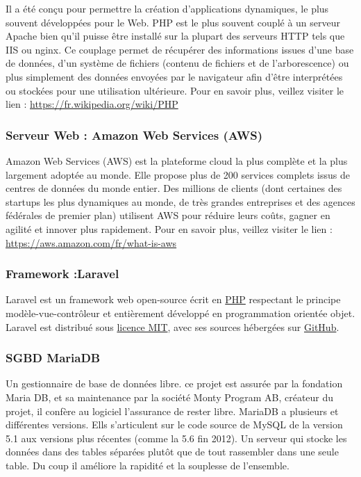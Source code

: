 Il a été conçu pour permettre la création d'applications dynamiques, le plus souvent développées pour le Web. PHP est le plus souvent couplé à un serveur Apache bien qu'il puisse être installé sur la plupart des serveurs HTTP tels que IIS ou nginx. Ce couplage permet de récupérer des informations issues d'une base de données, d'un système de fichiers (contenu de fichiers et de l'arborescence) ou plus simplement des données envoyées par le navigateur afin d'être interprétées ou stockées pour une utilisation ultérieure.
\newline Pour en savoir plus, veillez
visiter le lien : \href{https://fr.wikipedia.org/wiki/PHP}{https://fr.wikipedia.org/wiki/PHP}

\subsubsection{Serveur Web : Amazon Web Services (AWS)}
Amazon Web Services (AWS) est la plateforme cloud la plus complète et la plus largement adoptée au monde. Elle propose plus de 200 services complets issus de centres de données du monde entier. Des millions de clients (dont certaines des startups les plus dynamiques au monde, de très grandes entreprises et des agences fédérales de premier plan) utilisent AWS pour réduire leurs coûts, gagner en agilité et innover plus rapidement.
\newline Pour en savoir plus, veillez
visiter le lien : \href{https://aws.amazon.com/fr/what-is-aws/#:~:text=Amazon%20Web%20Services%20(AWS)%20est,de%20donn%C3%A9es%20du%20monde%20entier.}{https://aws.amazon.com/fr/what-is-aws}

\subsubsection{Framework :Laravel}
Laravel est un framework web open-source écrit en  \href{https://fr.wikipedia.org/wiki/PHP}{PHP} respectant le principe modèle-vue-contrôleur et entièrement développé en programmation orientée objet. Laravel est distribué sous \href{https://fr.wikipedia.org/wiki/Licence_MIT}{licence MIT}, avec ses sources hébergées sur 
\href{https://fr.wikipedia.org/wiki/GitHub}{GitHub}.
\subsubsection{SGBD MariaDB}
Un gestionnaire de base de données libre.
ce projet est assurée par la fondation Maria DB, et sa
maintenance par la société Monty Program AB, créateur du
projet, il confère au logiciel l'assurance de rester libre. MariaDB a
plusieurs et différentes versions. Ells s'articulent sur le code
source de MySQL de la version 5.1 aux versions plus récentes
(comme la 5.6 fin 2012). Un serveur qui stocke les données dans
des tables séparées plutôt que de tout rassembler dans une seule
table. Du coup il améliore la rapidité et la souplesse de
l'ensemble.
